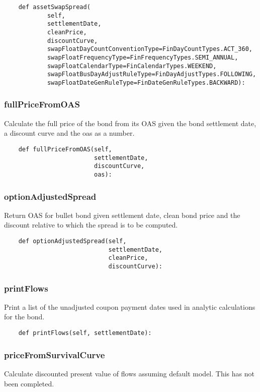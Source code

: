 \documentclass[twoside,11pt]{book}
\begin{document}
\begin{lstlisting}
    def assetSwapSpread(
            self,
            settlementDate,
            cleanPrice,
            discountCurve,
            swapFloatDayCountConventionType=FinDayCountTypes.ACT_360,
            swapFloatFrequencyType=FinFrequencyTypes.SEMI_ANNUAL,
            swapFloatCalendarType=FinCalendarTypes.WEEKEND,
            swapFloatBusDayAdjustRuleType=FinDayAdjustTypes.FOLLOWING,
            swapFloatDateGenRuleType=FinDateGenRuleTypes.BACKWARD):
\end{lstlisting}

\subsubsection*{{\bf fullPriceFromOAS}}
Calculate the full price of the bond from its OAS given the bond settlement date, a discount curve and the oas as a number.  

\begin{lstlisting}
    def fullPriceFromOAS(self,
                         settlementDate,
                         discountCurve,
                         oas):
\end{lstlisting}

\subsubsection*{{\bf optionAdjustedSpread}}
Return OAS for bullet bond given settlement date, clean bond price and the discount relative to which the spread is to be computed.  

\begin{lstlisting}
    def optionAdjustedSpread(self,
                             settlementDate,
                             cleanPrice,
                             discountCurve):
\end{lstlisting}

\subsubsection*{{\bf printFlows}}
Print a list of the unadjusted coupon payment dates used in analytic calculations for the bond.  

\begin{lstlisting}
    def printFlows(self, settlementDate):
\end{lstlisting}

\subsubsection*{{\bf priceFromSurvivalCurve}}
Calculate discounted present value of flows assuming default model. This has not been completed.  
\end{document}
